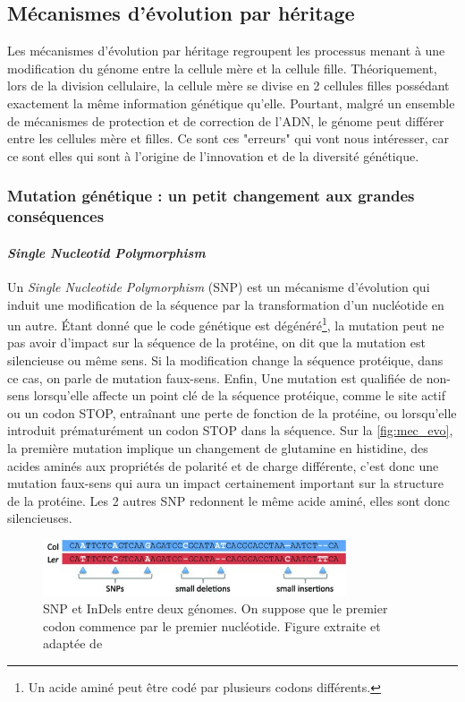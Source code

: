 \subsection{Mécanismes d'évolution par héritage}
\label{sec:evo_ver}
Les mécanismes d'évolution par héritage regroupent les processus menant à une modification du génome entre la cellule mère et la cellule fille. Théoriquement, lors de la division cellulaire, la cellule mère se divise en 2 cellules filles possédant exactement la même information génétique qu'elle. Pourtant, malgré un ensemble de mécanismes de protection et de correction de l'ADN, le génome peut différer entre les cellules mère et filles. Ce sont ces "erreurs" qui vont nous intéresser, car ce sont elles qui sont à l'origine de l'innovation et de la diversité génétique.

\subsubsection{Mutation génétique : un petit changement aux grandes conséquences}
\paragraph{\textit{Single Nucleotid Polymorphism}}

Un \textit{Single Nucleotide Polymorphism} (SNP) est un mécanisme d'évolution qui induit une modification de la séquence par la transformation d'un nucléotide en un autre. Étant donné que le code génétique est dégénéré\footnote{Un acide aminé peut être codé par plusieurs codons différents.}, la mutation peut ne pas avoir d'impact sur la séquence de la protéine, on dit que la mutation est silencieuse ou même sens. Si la modification change la séquence protéique, dans ce cas, on parle de mutation faux-sens. Enfin, Une mutation est qualifiée de non-sens lorsqu'elle affecte un point clé de la séquence protéique, comme le site actif ou un codon STOP, entraînant une perte de fonction de la protéine, ou lorsqu'elle introduit prématurément un codon STOP dans la séquence. Sur la \autoref{fig:mec_evo}, la première mutation implique un changement de glutamine en histidine, des acides aminés aux propriétés de polarité et de charge différente, c'est donc une mutation faux-sens qui aura un impact certainement important sur la structure de la protéine. Les 2 autres SNP redonnent le même acide aminé, elles sont donc silencieuses.

\begin{figure}[htbp]
    \centering
    \includegraphics[width=0.8\textwidth,height=\textheight,keepaspectratio]{images/Mec_evo.jpg}
    \caption[Identification des SNP et indels entre 2 génomes]{SNP et InDels entre deux génomes. On suppose que le premier codon commence par le premier nucléotide. Figure extraite et adaptée de \cite{qi_detection_2014}}
    \label{fig:mec_evo}
\end{figure}


